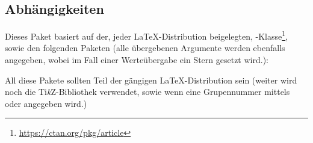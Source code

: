 \documentclass{sopra-base}
\begin{document}
\subsection{Abhängigkeiten}
    Dieses Paket basiert auf der, jeder \LaTeX-Distribution beigelegten,
    -Klasse\footnote{\url{https://ctan.org/pkg/article}},
    sowie den folgenden Paketen (alle übergebenen Argumente werden ebenfalls
    angegeben, wobei im Fall einer Werteübergabe ein Stern gesetzt wird.):
    \begin{multicols}{3}
    \end{multicols}
    All diese Pakete sollten Teil der gängigen \LaTeX-Distribution sein (weiter
    wird noch die Ti\textit{k}Z-Bibliothek  verwendet, sowie 
    wenn eine Grupennummer mittels  oder 
    angegeben wird.)
\end{document}
